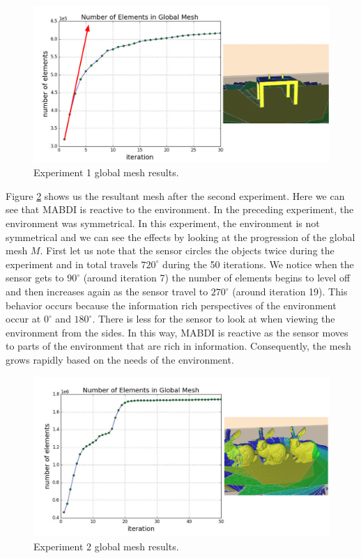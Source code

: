 \begin{figure}[h]%
\centering
  \includegraphics[width=\textwidth]{figures/results_run1_gm.pdf}
  \caption{Experiment 1 global mesh results.}
  \label{fig:gm_1}
\end{figure}

Figure \ref{fig:gm_2} shows us the resultant mesh after the second experiment.
Here we can see that MABDI is reactive to the environment. In the preceding
experiment, the environment was symmetrical. In this experiment, the environment
is not symmetrical and we can see the effects by looking at the progression of
the global mesh $M$. First let us note that the sensor circles the objects twice
during the experiment and in total travels $720^{\circ}$ during the 50
iterations. We notice when the sensor gets to $90^{\circ}$ (around iteration
7) the number of elements begins to level off and then increases again as the
sensor travel to $270^{\circ}$ (around iteration 19). This behavior occurs
because the information rich perspectives of the environment occur at
$0^{\circ}$ and $180^{\circ}$. There is less for the sensor to look at when
viewing the environment from the sides. In this way, MABDI is reactive as the
sensor moves to parts of the environment that are rich in information.
Consequently, the mesh grows rapidly based on the needs of the environment.

\begin{figure}[h]%
\centering
  \includegraphics[width=\textwidth]{figures/results_run2_gm.pdf}
  \caption{Experiment 2 global mesh results.}
  \label{fig:gm_2}
\end{figure}

